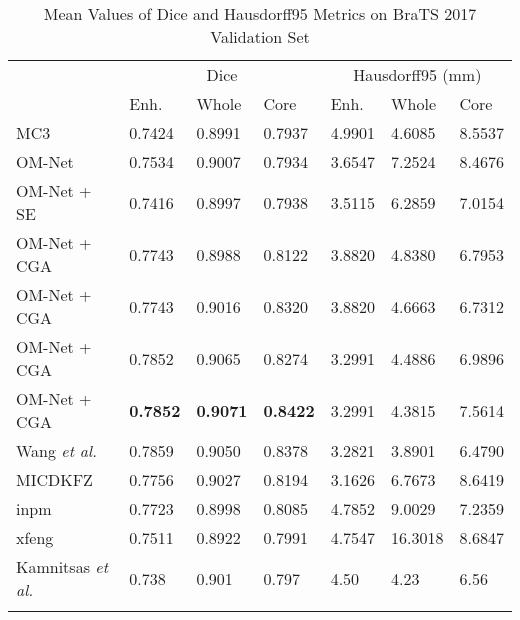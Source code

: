 \documentclass[journal,twoside]{IEEEtran}
\begin{document}
\begin{table}
	\newcommand{\tabincell}[2]{\begin{tabular}{@{}#1@{}}#2\end{tabular}}	
	\fontsize{6.5}{14}\selectfont
	\centering
	\caption{Mean Values of Dice and Hausdorff95 Metrics on BraTS 2017 Validation Set }	
	\label{Table3}
	\begin{threeparttable}
		\begin{tabular}{p{2cm}<{\centering}|p{0.65cm}<{\centering}|p{0.65cm}<{\centering}|p{0.65cm}<{\centering}|p{0.65cm}<{\centering}|p{0.65cm}<{\centering}|p{0.65cm}<{\centering}}
			\shline
			\multirow{2}{*}{Method} & \multicolumn{3}{c|}{Dice} & \multicolumn{3}{c}{Hausdorff95 (mm)}\\ 
			\cline{2-7}
			&Enh. &Whole &Core &Enh. &Whole &Core   \\
			\hline  
			MC3 &0.7424 &0.8991 &0.7937 &4.9901 &4.6085 &8.5537  \\			
			\hline  
			OM-Net &0.7534 &0.9007 &0.7934 &3.6547 &7.2524 &8.4676  \\
			\hline
			OM-Net + SE  &0.7416 &0.8997 &0.7938 &3.5115 &6.2859 &7.0154 \\
			\hline
			OM-Net + CGA  &0.7743 &0.8988 &0.8122 &3.8820 &4.8380 &6.7953  \\
			\hline
			OM-Net + CGA  &0.7743 &0.9016 &0.8320 &3.8820 &4.6663 &6.7312  \\			
			\hline
			OM-Net + CGA\tnote{}   &0.7852 &0.9065 &0.8274 &3.2991 &4.4886 &6.9896  \\
			\hline
			OM-Net + CGA &\textbf{0.7852} &\textbf{0.9071} &\textbf{0.8422} &3.2991 &4.3815 &7.5614  \\			
			\hline
			\hline		
			Wang \emph{et al.} \cite{wang2017automatic}  &0.7859 &0.9050 &0.8378 &3.2821 &3.8901   &6.4790\\ 
			\hline
			MICDKFZ &0.7756 &0.9027 &0.8194 &3.1626 &6.7673 &8.6419 \\
			\hline
			inpm &0.7723 &0.8998 &0.8085 &4.7852 &9.0029 &7.2359 \\
			\hline
			xfeng &0.7511 &0.8922 &0.7991 &4.7547 &16.3018 &8.6847  \\
			\hline
			Kamnitsas \emph{et al.} \cite{kamnitsas2017ensembles}  &0.738 &0.901 &0.797 &4.50 &4.23  &6.56\\ 	        	
			\shline			
			
		\end{tabular}
		
	\end{threeparttable}
\end{table}
\end{document}
